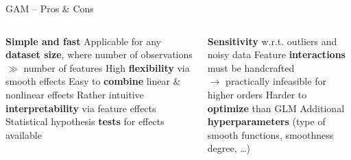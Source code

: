 \begin{frame2}{GAM -- Pros \& Cons}

\begin{columns}[onlytextwidth]
  \begin{column}{0.5\textwidth}

    \begin{itemize}
      \positem \textbf{Simple and fast}
      \positem Applicable for any \textbf{dataset size}, where number of
      observations \\$\gg$ number of features
      \positem High \textbf{flexibility} via smooth effects
      \positem Easy to \textbf{combine} linear \& nonlinear effects
      \positem Rather intuitive \textbf{interpretability} via feature effects
      \positem Statistical hypothesis \textbf{tests} for effects available
    \end{itemize}
  \end{column}

  \begin{column}{0.5\textwidth}

    \begin{itemize}
      \negitem \textbf{Sensitivity} w.r.t. outliers and noisy data
      \negitem Feature \textbf{interactions} must be handcrafted\\
      $\rightarrow$ practically infeasible for higher orders
      \negitem Harder to \textbf{optimize} than GLM
      \negitem Additional \textbf{hyperparameters} (type of smooth functions,
      smoothness degree, \dots)
    \end{itemize}
  \end{column}
\end{columns}
  
\end{frame2}
